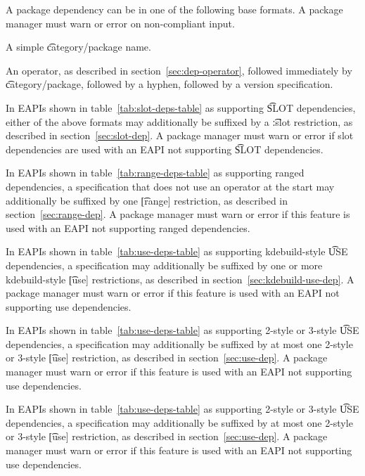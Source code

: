 A package dependency can be in one of the following base formats. A package manager must warn or
error on non-compliant input.

\begin{compactitem}
\item A simple \t{category/package} name.
\item An operator, as described in section~\ref{sec:dep-operator}, followed immediately by
    \t{category/package}, followed by a hyphen, followed by a version specification.
\end{compactitem}

In EAPIs shown in table~\ref{tab:slot-deps-table} as supporting \t{SLOT} dependencies, either of the
above formats may additionally be suffixed by a \t{:slot} restriction, as described in
section~\ref{sec:slot-dep}. A package manager must warn or error if slot dependencies are used with an
EAPI not supporting \t{SLOT} dependencies.

\IFKDEBUILDELSE
{
    In EAPIs shown in table~\ref{tab:range-deps-table} as supporting ranged dependencies, a
    specification that does not use an operator at the start may additionally be suffixed by one
    \t{[range]} restriction, as described in section~\ref{sec:range-dep}. A package manager must warn or
    error if this feature is used with an EAPI not supporting ranged dependencies.
}{
}

\IFKDEBUILDELSE
{
     In EAPIs shown in table~\ref{tab:use-deps-table} as supporting
    kdebuild-style \t{USE} dependencies, a specification may additionally be suffixed by one or more
    kdebuild-style \t{[use]} restrictions, as described in section~\ref{sec:kdebuild-use-dep}. A
    package manager must warn or error if this feature is used with an EAPI not supporting use
    dependencies.

    In EAPIs shown in table~\ref{tab:use-deps-table} as supporting 2-style or 3-style \t{USE}
    dependencies, a specification may additionally be suffixed by at most one 2-style or 3-style
    \t{[use]} restriction, as described in section~\ref{sec:use-dep}. A package manager must warn or
    error if this feature is used with an EAPI not supporting use dependencies.
}{
     In EAPIs shown in table~\ref{tab:use-deps-table} as supporting 2-style
    or 3-style \t{USE} dependencies, a specification may additionally be suffixed by at most one
    2-style or 3-style \t{[use]} restriction, as described in section~\ref{sec:use-dep}. A package
    manager must warn or error if this feature is used with an EAPI not supporting use dependencies.
}

